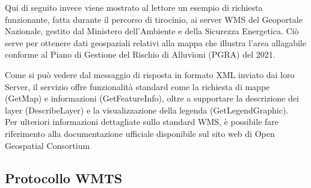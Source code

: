 
Qui di seguito invece viene mostrato al lettore un esempio di richiesta funzionante, fatta durante il percorso di tirocinio, ai server WMS del Geoportale Nazionale, gestito dal Ministero dell'Ambiente e della Sicurezza Energetica.
Ciò serve per ottenere dati geospaziali relativi alla mappa che illustra l'area allagabile conforme al Piano di Gestione del Rischio di Alluvioni (PGRA) del 2021.

Come si può vedere dal messaggio di risposta \cite{GetCapabilitiesWMS} in formato XML inviato dai loro Server,
il servizio offre funzionalità standard come la richiesta di mappe (GetMap) e informazioni (GetFeatureInfo), oltre a supportare la descrizione dei layer (DescribeLayer) e la visualizzazione della legenda (GetLegendGraphic).
\\Per ulteriori informazioni dettagliate sullo standard WMS, è possibile fare riferimento alla documentazione ufficiale disponibile sul sito web di Open Geospatial Consortium \cite{DocumentazioneWMS}

\subsection{Protocollo WMTS}


